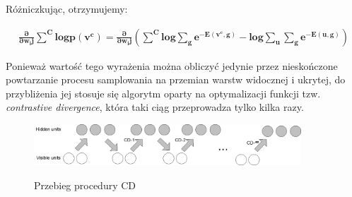 \documentclass[a4paper,10pt]{report}
\begin{document}
Różniczkując, otrzymujemy:

\begin{align}
 \mathbf{\frac{\partial}{\partial w_ij} \sum^{C} log p(v^c) = \frac{\partial}{\partial w_ij} \left(  \sum^C log \sum_g e^{-E(v^c, g)} - log \sum_u \sum_g e^{-E(u,g)} \right)}
\end{align}

Ponieważ wartość tego wyrażenia można obliczyć jedynie przez nieskończone powtarzanie procesu samplowania na przemian warstw widocznej i ukrytej, do przybliżenia jej stosuje się algorytm oparty na optymalizacji funkcji tzw. \textit{contrastive divergence}, która taki ciąg przeprowadza tylko kilka razy.

\begin{figure}
 \centering
 \includegraphics[width=10cm]{imgs/cd-n.png}
 \label{fig:contrastivedivergence}
 \caption{Przebieg procedury CD \cite{cifar}}
\end{figure}
\end{document}
